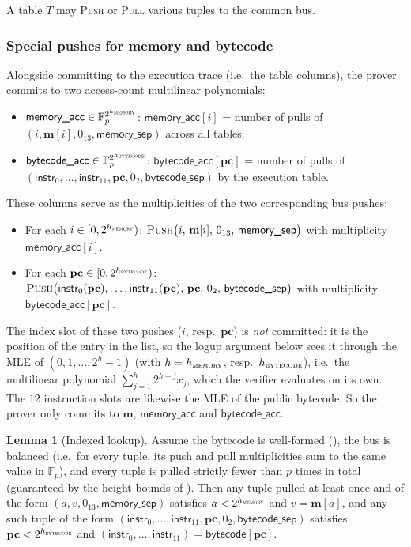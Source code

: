 \documentclass{article}
\theoremstyle{definition}
\newcommand{\Fp}{\mathbb F_p}
\newtheorem{lemma}{Lemma}
\begin{document}
A table $T$ may \textsc{Push} or \textsc{Pull} various tuples to the common bus.

\subsubsection{Special pushes for memory and bytecode}\label{sec:special-pushes}

Alongside committing to the execution trace (i.e.\ the table columns), the prover commits to two access-count multilinear polynomials:
\begin{itemize}
    \item $\textsf{memory\_acc} \in \Fp^{2^{h_\textsc{memory}}}$: $\textsf{memory\_acc}[i]$ = number of pulls of $(i, \textbf{m}[i], 0_{13}, \textsf{memory\_sep})$ across all tables.
    \item $\textsf{bytecode\_acc} \in \Fp^{2^{h_\textsc{bytecode}}}$: $\textsf{bytecode\_acc}[\textbf{pc}]$ = number of pulls of $(\textsf{instr}_0, \dots, \textsf{instr}_{11}, \textbf{pc}, 0_2, \textsf{bytecode\_sep})$ by the execution table.
\end{itemize}
These columns serve as the multiplicities of the two corresponding bus pushes:
\begin{itemize}
    \item For each $i \in [0, 2^{h_\textsc{memory}})$: $\textsc{Push}\big(i,\, \textbf{m}[i],\, 0_{13},\, \textsf{memory\_sep}\big)$ with multiplicity $\textsf{memory\_acc}[i]$.
    \item For each $\textbf{pc} \in [0, 2^{h_\textsc{bytecode}})$: $\textsc{Push}\big(\textsf{instr}_0(\textbf{pc}), \dots, \textsf{instr}_{11}(\textbf{pc}),\, \textbf{pc},\, 0_2,\, \textsf{bytecode\_sep}\big)$ with multiplicity $\textsf{bytecode\_acc}[\textbf{pc}]$.
\end{itemize}

The index slot of these two pushes ($i$, resp.\ $\textbf{pc}$) is \emph{not} committed: it is the position of the entry in the list, so the logup argument below sees it through the MLE of $(0, 1, \ldots, 2^h - 1)$ (with $h = h_\textsc{memory}$, resp.\ $h_\textsc{bytecode}$), i.e.\ the multilinear polynomial $\sum_{j=1}^{h} 2^{h-j} x_j$, which the verifier evaluates on its own. The $12$ instruction slots are likewise the MLE of the public bytecode. So the prover only commits to $\textbf{m}$, $\textsf{memory\_acc}$ and $\textsf{bytecode\_acc}$.

\begin{lemma}[Indexed lookup]\label{lem:indexed-lookup}
Assume the bytecode is well-formed (), the bus is balanced (i.e.\ for every tuple, its push and pull multiplicities sum to the same value in $\Fp$), and every tuple is pulled strictly fewer than $p$ times in total (guaranteed by the height bounds of ). Then any tuple pulled at least once and of the form $(a, v, 0_{13}, \textsf{memory\_sep})$ satisfies $a < 2^{h_\textsc{memory}}$ and $v = \textbf{m}[a]$, and any such tuple of the form $(\textsf{instr}_0, \ldots, \textsf{instr}_{11}, \textbf{pc}, 0_2, \textsf{bytecode\_sep})$ satisfies $\textbf{pc} < 2^{h_\textsc{bytecode}}$ and $(\textsf{instr}_0, \ldots, \textsf{instr}_{11}) = \textsf{bytecode}[\textbf{pc}]$.
\end{lemma}
\end{document}
